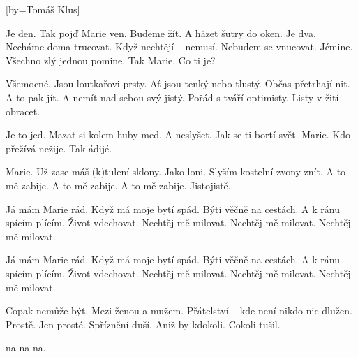 [by={Tomáš Klus}]

\beginverse{}
Je den. Tak pojď Marie ven.
Budeme žít. A házet šutry do oken.
Je dva. Necháme doma trucovat.
Když nechtějí -- nemusí. Nebudem se vnucovat.
Jémine. Všechno zlý jednou pomine.
Tak Marie. Co ti je?
\endverse{}

\beginverse{}
Všemocné. Jsou loutkařovi prsty.
Ať jsou tenký nebo tlustý. Občas přetrhají nit.
A to pak jít. A nemít nad sebou svý jistý.
Pořád s tváří optimisty. Listy v žití obracet.
\endverse{}

\beginverse{}
Je to jed. Mazat si kolem huby med.
A neslyšet. Jak se ti bortí svět.
Marie. Kdo přežívá nežije. Tak ádijé. 
\endverse{}

\beginverse{}
Marie. Už zase máš (k)tulení sklony.
Jako loni. Slyším kostelní zvony znít.
A to mě zabije. A to mě zabije.
A to mě zabije. Jistojistě.
\endverse{}

\beginchorus{}
Já mám Marie rád. Když má moje bytí spád.
Býti věčně na cestách. A k ránu spícím plícím.
Život vdechovat. Nechtěj mě milovat.
Nechtěj mě milovat. Nechtěj mě milovat. 
\endchorus{}

\repeatingchorus{}
\beginchorus{}
Já mám Marie rád. Když má moje bytí spád.
Býti věčně na cestách. A k ránu spícím plícím.
Život vdechovat. Nechtěj mě milovat.
Nechtěj mě milovat. Nechtěj mě milovat. 
\endchorus{}

\beginverse{}
Copak nemůže být. Mezi ženou a mužem.
Přátelství -- kde není nikdo nic dlužen. Prostě.
Jen prosté. Spříznění duší.
Aniž by kdokoli. Cokoli tušil.
\endverse{}

\beginverse{}
na na na...     
\endverse{}


